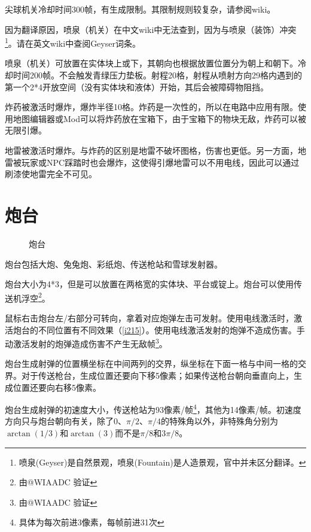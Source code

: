 尖球机关冷却时间300帧，有生成限制。其限制规则较复杂，请参阅wiki。

因为翻译原因，喷泉（机关）在中文wiki中无法查到，因为与喷泉（装饰）冲突\footnote{喷泉(Geyser)是自然景观，喷泉(Fountain)是人造景观，官中并未区分翻译。}。请在英文wiki中查阅Geyser词条。

喷泉（机关）可放置在实体块上或下，其朝向也根据放置位置分为朝上和朝下。冷却时间200帧。不会触发青绿压力垫板。射程20格，射程从喷射方向29格内遇到的第一个2*4开放空间（没有实体块和液体）开始，其后会被障碍物阻挡。

炸药被激活时爆炸，爆炸半径10格。炸药是一次性的，所以在电路中应用有限。使用地图编辑器或Mod可以将炸药放在宝箱下，由于宝箱下的物块无敌，炸药可以被无限引爆。

地雷被激活时爆炸。与炸药的区别是地雷不破坏图格，伤害也更低。另一方面，地雷被玩家或NPC踩踏时也会爆炸，这使得引爆地雷可以不用电线，因此可以通过刷漆使地雷完全不可见。

\section{炮台}
\begin{figure}[!ht]
\centering
{}\qquad
{}\qquad
{}\qquad
{}\qquad
{}
\caption{炮台}
\end{figure}
炮台包括大炮、兔兔炮、彩纸炮、传送枪站和雪球发射器。

炮台大小为4*3，但是可以放置在两格宽的实体块、平台或锭上。炮台可以使用传送机浮空\footnote{由@WIAADC 验证}。

鼠标右击炮台左/右部分可转向，拿着对应炮弹左击可发射。使用电线激活时，激活炮台的不同位置有不同效果（\autoref{i215}）。使用电线激活发射的炮弹不造成伤害。手动激活发射的炮弹造成伤害不产生无敌帧\footnote{由@WIAADC 验证}。

炮台生成射弹的位置横坐标在中间两列的交界，纵坐标在下面一格与中间一格的交界。对于传送枪台，生成位置还要向下移5像素；如果传送枪台朝向垂直向上，生成位置还要向右移5像素。

炮台生成射弹的初速度大小，传送枪站为93像素/帧\footnote{具体为每次前进3像素，每帧前进31次}，其他为14像素/帧。初速度方向只与炮台朝向有关，除了0、$\pi/2$、$\pi/4$的特殊角以外，非特殊角分别为$\arctan(1/3)$和$\arctan(3)$而不是$\pi/8$和$3\pi/8$。

